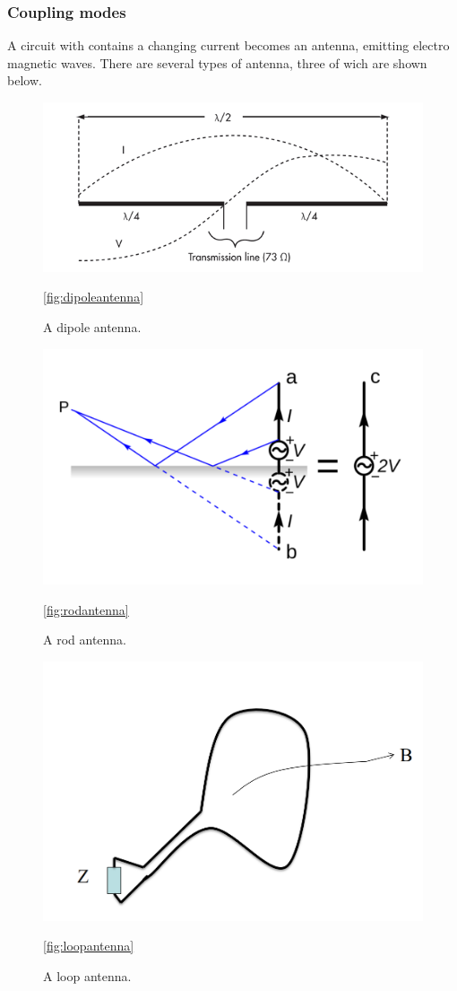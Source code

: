 \subsubsection*{Coupling modes}
A circuit with contains a changing current becomes an antenna, emitting electro
magnetic waves. There are several types of antenna, three of wich are shown
below. 
\begin{figure}[H]
\centering
\includegraphics{./figures/FIG_dipoleantenna.png}
\caption{A dipole antenna.}
\ref{fig:dipoleantenna}
\end{figure}
\begin{figure}[H]
\centering
\includegraphics[scale=0.3]{./figures/FIG_rodantenna.png}
\caption{A rod antenna.}
\ref{fig:rodantenna}
\end{figure}
\begin{figure}[H]
\centering
\includegraphics[scale=0.3]{./figures/FIG_loopantenna.png}
\caption{A loop antenna.}
\ref{fig:loopantenna}
\end{figure}
